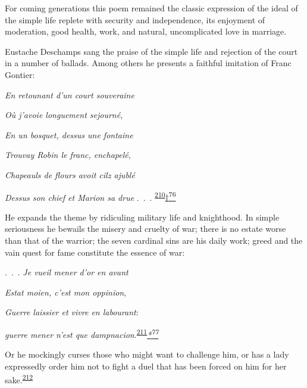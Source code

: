 For coming generations this poem remained the classic expression of the
ideal of the simple life replete with security and independence, its
enjoyment of moderation, good health, work, and natural, uncomplicated
love in marriage.

Eustache Deschamps sang the praise of the simple life and rejection of
the court in a number of ballads. Among others he presents a faithful
imitation of Franc Gontier:

\emph{En retounant d'un court souveraine}

\emph{Où j'avoie longuement sejourné},

\emph{En un bosquet, dessus une fontaine}

\emph{Trouvay Robin le franc, enchapelé},

\emph{Chapeauls de flours avoit cilz ajublé}

\emph{Dessus son chief et Marion sa drue} .~.~.
\textsuperscript{\protect\hypertarget{10_Chapter_Three__THE_HEROIC_DREAM.xhtmlux5cux23id_1517}{\protect\hyperlink{23_NOTES.xhtmlux5cux23id_1518}{210}}}\protect\hypertarget{10_Chapter_Three__THE_HEROIC_DREAM.xhtmlux5cux23id_3091}{\protect\hyperlink{23_NOTES.xhtmlux5cux23id_3092}{†\textsuperscript{76}}}

He expands the theme by ridiculing military life and knighthood. In
simple seriousness he bewails the misery and cruelty of war; there is no
estate worse than that of the warrior; the seven cardinal sins are his
daily work; greed and the vain quest for fame constitute the essence of
war:

.~.~.
\protect\hypertarget{10_Chapter_Three__THE_HEROIC_DREAM.xhtmlux5cux23page_123}{}{}\emph{Je
vueil mener d'or en avant}

\emph{Estat moien, c'est mon oppinion},

\emph{Guerre laissier et vivre en labourant}:

\emph{guerre mener n'est que
dampnacion}.\textsuperscript{\protect\hypertarget{10_Chapter_Three__THE_HEROIC_DREAM.xhtmlux5cux23id_1515}{\protect\hyperlink{23_NOTES.xhtmlux5cux23id_1516}{211}}}\emph{\protect\hypertarget{10_Chapter_Three__THE_HEROIC_DREAM.xhtmlux5cux23id_3093}{\protect\hyperlink{23_NOTES.xhtmlux5cux23id_3094}{*\textsuperscript{77}}}}

Or he mockingly curses those who might want to challenge him, or has a
lady expressedly order him not to fight a duel that has been forced on
him for her
sake.\textsuperscript{\protect\hypertarget{10_Chapter_Three__THE_HEROIC_DREAM.xhtmlux5cux23id_1513}{\protect\hyperlink{23_NOTES.xhtmlux5cux23id_1514}{212}}}

